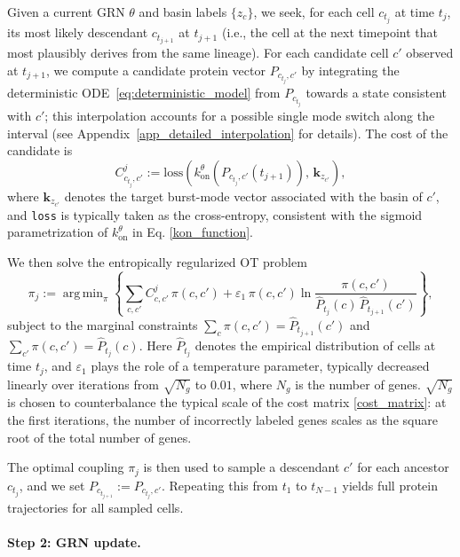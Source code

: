 \documentclass[a4paper, 11pt]{article}
\DeclareMathOperator*{\argmin}{arg\,min}
\theoremstyle{plain}
\theoremstyle{remark}
\begin{document}
Given a current GRN $\theta$ and basin labels $\{z_c\}$, we seek, for each cell $c_{t_j}$ at time $t_j$, its most likely descendant $c_{t_{j+1}}$ at $t_{j+1}$ (i.e., the cell at the next timepoint that most plausibly derives from the same lineage). For each candidate cell $c'$ observed at $t_{j+1}$, we compute a candidate protein vector $P_{c_{t_j},c'}$ by integrating the deterministic ODE~\eqref{eq:deterministic_model} from $P_{c_{t_j}}$ towards a state consistent with $c'$; this interpolation accounts for a possible single mode switch along the interval (see Appendix~\ref{app_detailed_interpolation} for details). The cost of the candidate is
\begin{equation}
    \label{cost_matrix}
    C^j_{c_{t_j},c'} := \mathrm{loss}\!\left(k_{\mathrm{on}}^{\theta}\!\left(P_{c_{t_j},c'}(t_{j+1})\right),\, \mathbf{k}_{z_{c'}}\right),
\end{equation}
where $\mathbf{k}_{z_{c'}}$ denotes the target burst-mode vector associated with the basin of $c'$, and \texttt{loss} is typically taken as the cross-entropy, consistent with the sigmoid parametrization of $k_{\mathrm{on}}^\theta$ in Eq. \eqref{kon_function}.

We then solve the entropically regularized OT problem
\begin{equation}
    \label{eq:proteins_update}
    \pi_j := \argmin_{\pi}\left\{\sum_{c,c'} C^j_{c,c'}\,\pi(c,c') + \varepsilon_1\,\pi(c,c')\ln\frac{\pi(c,c')}{\hat{P}_{t_j}(c)\,\hat{P}_{t_{j+1}}(c')}\right\},
\end{equation}
subject to the marginal constraints $\sum_c \pi(c,c') = \hat{P}_{t_{j+1}}(c')$ and $\sum_{c'}\pi(c,c') = \hat{P}_{t_j}(c)$. Here $\hat{P}_{t_j}$ denotes the empirical distribution of cells at time $t_j$, and $\varepsilon_1$ plays the role of a temperature parameter, typically decreased linearly over iterations from $\sqrt{N_g}$ to $0.01$, where $N_g$ is the number of genes. $\sqrt{N_g}$ is chosen to counterbalance the typical scale of the cost matrix \eqref{cost_matrix}: at the first iterations, the number of incorrectly labeled genes scales as the square root of the total number of genes.

The optimal coupling $\pi_j$ is then used to sample a descendant $c'$ for each ancestor $c_{t_j}$, and we set $P_{c_{t_{j+1}}} := P_{c_{t_j},c'}$. Repeating this from $t_1$ to $t_{N-1}$ yields full protein trajectories for all sampled cells.

\paragraph{Step 2: GRN update.}
\end{document}
